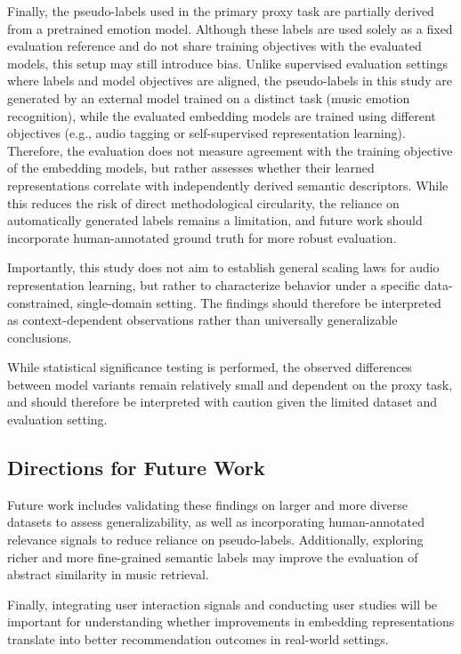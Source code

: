 \documentclass[sigconf]{acmart}
\begin{document}
Finally, the pseudo-labels used in the primary proxy task are partially derived from a pretrained emotion model. Although these labels are used solely as a fixed evaluation reference and do not share training objectives with the evaluated models, this setup may still introduce bias. Unlike supervised evaluation settings where labels and model objectives are aligned, the pseudo-labels in this study are generated by an external model trained on a distinct task (music emotion recognition), while the evaluated embedding models are trained using different objectives (e.g., audio tagging or self-supervised representation learning). Therefore, the evaluation does not measure agreement with the training objective of the embedding models, but rather assesses whether their learned representations correlate with independently derived semantic descriptors. While this reduces the risk of direct methodological circularity, the reliance on automatically generated labels remains a limitation, and future work should incorporate human-annotated ground truth for more robust evaluation.

Importantly, this study does not aim to establish general scaling laws for audio representation learning, but rather to characterize behavior under a specific data-constrained, single-domain setting. The findings should therefore be interpreted as context-dependent observations rather than universally generalizable conclusions.

While statistical significance testing is performed, the observed differences between model variants remain relatively small and dependent on the proxy task, and should therefore be interpreted with caution given the limited dataset and evaluation setting.

\subsection{Directions for Future Work}
Future work includes validating these findings on larger and more diverse datasets to assess generalizability, as well as incorporating human-annotated relevance signals to reduce reliance on pseudo-labels. Additionally, exploring richer and more fine-grained semantic labels may improve the evaluation of abstract similarity in music retrieval.

Finally, integrating user interaction signals and conducting user studies will be important for understanding whether improvements in embedding representations translate into better recommendation outcomes in real-world settings.
\end{document}
